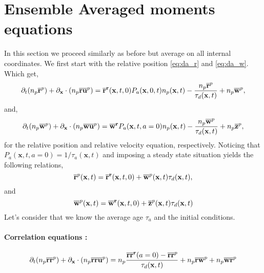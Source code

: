 \section{Ensemble Averaged moments equations}

In this section we proceed similarly as before but average on all internal coordinates. 
We first start with the relative position \ref{eq:da_r} and \ref{eq:da_w}. 
Which get,
\begin{equation}
    \pddt (\pnavg{\textbf{r}})
    + \partial_{\textbf{x}} \cdot (\pnavg{\textbf{r}\textbf{u}})
    =  
    \condavg{\textbf{r}}{\textbf{r}}(\textbf{x},t,0)P_a(\textbf{x},0,t)n_p(\textbf{x},t)
    - \frac{\pnavg{\textbf{r}}}{\tau_d(\textbf{x},t)}
    + \pnavg{\textbf{w}},
    \label{eq:dt_avg_r}
\end{equation}
and, 
\begin{equation}
    \partial_t (n_p\overline{\textbf{w}}^{p})
    + \partial_{\textbf{x}} \cdot (n_p\overline{\textbf{w}\textbf{u} }^{p})
    =  
    \overline{\textbf{w}}^{\textbf{r}} P_a(\textbf{x},t,a=0)n_p(\textbf{x},t)
    - \frac{n_p\overline{\textbf{w}}^{p}}{\tau_d(\textbf{x},t)}
    + n_p\overline{\textbf{z}}^{p},
\end{equation}
for the relative position and relative velocity equation, respectively. 
Noticing that  $P_a(\textbf{x},t,a=0) = 1/\tau_a(\textbf{x},t)$ and imposing a steady state situation yields the following relations, 
\begin{equation}
    \overline{\textbf{r}}^{p} (\textbf{x},t)
    = \overline{\textbf{r}}^{\textbf{r}}(\textbf{x},t,0)
    + \overline{\textbf{w}}^{p}(\textbf{x},t)\tau_d(\textbf{x},t),
\end{equation}
and
\begin{equation}
    \overline{\textbf{w}}^{p} (\textbf{x},t)
    = \overline{\textbf{w}}^{\textbf{r}}(\textbf{x},t,0)
    + \overline{\textbf{z}}^{p}(\textbf{x},t)\tau_d(\textbf{x},t)
\end{equation}
Let's consider that we know the average age $\tau_a$ and the initial conditions. 

\paragraph{Correlation equations :}

\begin{equation}
    \partial_t (n_p\overline{\textbf{rr}}^{p} )
    + \partial_{\textbf{x}} \cdot (n_p\overline{\textbf{rr}\textbf{u} }^{p})
    =    
    n_p\frac{\overline{\textbf{rr}}^{\textbf{r}}(a=0)
    - \overline{\textbf{rr}}^{p} }{\tau_d(\textbf{x},t)}
    + n_p\overline{\textbf{rw}}^{p}
    + n_p\overline{\textbf{wr}}^{p}
\end{equation}

